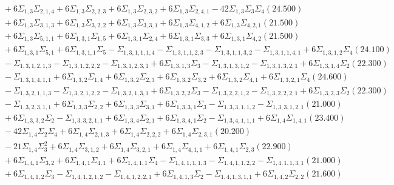 \documentclass[12pt]{article}
\begin{document}
\begin{landscape}
\begin{align*}
		&\quad\quad +6\Sigma_{1,3}\Sigma_{2,1,4}+6\Sigma_{1,3}\Sigma_{2,2,3}+6\Sigma_{1,3}\Sigma_{2,3,2}+6\Sigma_{1,3}\Sigma_{2,4,1}-42\Sigma_{1,3}\Sigma_{3}\Sigma_{4}(24.500) \\ 
		&\quad\quad +6\Sigma_{1,3}\Sigma_{3,1,3}+6\Sigma_{1,3}\Sigma_{3,2,2}+6\Sigma_{1,3}\Sigma_{3,3,1}+6\Sigma_{1,3}\Sigma_{4,1,2}+6\Sigma_{1,3}\Sigma_{4,2,1}(21.500) \\ 
		&\quad\quad +6\Sigma_{1,3}\Sigma_{5,1,1}+6\Sigma_{1,3,1}\Sigma_{1,5}+6\Sigma_{1,3,1}\Sigma_{2,4}+6\Sigma_{1,3,1}\Sigma_{3,3}+6\Sigma_{1,3,1}\Sigma_{4,2}(21.500) \\ 
		&\quad\quad +6\Sigma_{1,3,1}\Sigma_{5,1}+6\Sigma_{1,3,1,1}\Sigma_{5}-\Sigma_{1,3,1,1,1,4}-\Sigma_{1,3,1,1,2,3}-\Sigma_{1,3,1,1,3,2}-\Sigma_{1,3,1,1,4,1}+6\Sigma_{1,3,1,2}\Sigma_{4}(24.100) \\ 
		&\quad\quad -\Sigma_{1,3,1,2,1,3}-\Sigma_{1,3,1,2,2,2}-\Sigma_{1,3,1,2,3,1}+6\Sigma_{1,3,1,3}\Sigma_{3}-\Sigma_{1,3,1,3,1,2}-\Sigma_{1,3,1,3,2,1}+6\Sigma_{1,3,1,4}\Sigma_{2}(22.300) \\ 
		&\quad\quad -\Sigma_{1,3,1,4,1,1}+6\Sigma_{1,3,2}\Sigma_{1,4}+6\Sigma_{1,3,2}\Sigma_{2,3}+6\Sigma_{1,3,2}\Sigma_{3,2}+6\Sigma_{1,3,2}\Sigma_{4,1}+6\Sigma_{1,3,2,1}\Sigma_{4}(24.600) \\ 
		&\quad\quad -\Sigma_{1,3,2,1,1,3}-\Sigma_{1,3,2,1,2,2}-\Sigma_{1,3,2,1,3,1}+6\Sigma_{1,3,2,2}\Sigma_{3}-\Sigma_{1,3,2,2,1,2}-\Sigma_{1,3,2,2,2,1}+6\Sigma_{1,3,2,3}\Sigma_{2}(22.300) \\ 
		&\quad\quad -\Sigma_{1,3,2,3,1,1}+6\Sigma_{1,3,3}\Sigma_{2,2}+6\Sigma_{1,3,3}\Sigma_{3,1}+6\Sigma_{1,3,3,1}\Sigma_{3}-\Sigma_{1,3,3,1,1,2}-\Sigma_{1,3,3,1,2,1}(21.000) \\ 
		&\quad\quad +6\Sigma_{1,3,3,2}\Sigma_{2}-\Sigma_{1,3,3,2,1,1}+6\Sigma_{1,3,4}\Sigma_{2,1}+6\Sigma_{1,3,4,1}\Sigma_{2}-\Sigma_{1,3,4,1,1,1}+6\Sigma_{1,4}\Sigma_{1,4,1}(23.400) \\ 
		&\quad\quad -42\Sigma_{1,4}\Sigma_{2}\Sigma_{4}+6\Sigma_{1,4}\Sigma_{2,1,3}+6\Sigma_{1,4}\Sigma_{2,2,2}+6\Sigma_{1,4}\Sigma_{2,3,1}(20.200) \\ 
		&\quad\quad -21\Sigma_{1,4}\Sigma_{3}^{2}+6\Sigma_{1,4}\Sigma_{3,1,2}+6\Sigma_{1,4}\Sigma_{3,2,1}+6\Sigma_{1,4}\Sigma_{4,1,1}+6\Sigma_{1,4,1}\Sigma_{2,3}(22.900) \\ 
		&\quad\quad +6\Sigma_{1,4,1}\Sigma_{3,2}+6\Sigma_{1,4,1}\Sigma_{4,1}+6\Sigma_{1,4,1,1}\Sigma_{4}-\Sigma_{1,4,1,1,1,3}-\Sigma_{1,4,1,1,2,2}-\Sigma_{1,4,1,1,3,1}(21.000) \\ 
		&\quad\quad +6\Sigma_{1,4,1,2}\Sigma_{3}-\Sigma_{1,4,1,2,1,2}-\Sigma_{1,4,1,2,2,1}+6\Sigma_{1,4,1,3}\Sigma_{2}-\Sigma_{1,4,1,3,1,1}+6\Sigma_{1,4,2}\Sigma_{2,2}(21.600) \\ 

\end{align*}
\end{landscape}
\end{document}
